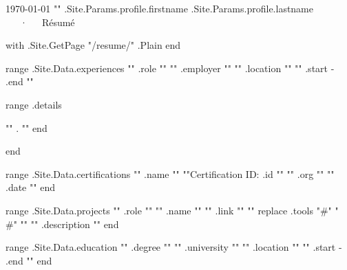 \documentclass[11pt, letterpaper]{awesome-cv}
\begin{document}
\makecvheader[C]

\makecvfooter
  {\today}
  {{"{"}}{{ .Site.Params.profile.firstname }} {{ .Site.Params.profile.lastname }}~~~·~~~Résumé}
  {\thepage}

\begin{cvparagraph}

{{ with .Site.GetPage "/resume/" }}{{ .Plain }}{{ end }}

\end{cvparagraph}

\begin{cventries}

{{ range .Site.Data.experiences }}
  \cventry
    {{"{"}}{{ .role }}{{"}"}}
    {{"{"}}{{ .employer }}{{"}"}}
    {{"{"}}{{ .location }}{{"}"}}
    {{"{"}}{{ .start }} - {{ .end }}{{"}"}}
    {
      \begin{cvitems}{{ range .details }}
        \item{{"{"}}{{ . }}{{"}"}}{{ end }}
      \end{cvitems}
    }

{{ end }}

\end{cventries}

\begin{cvhonors}
{{ range .Site.Data.certifications }}
  \cvhonor
    {{"{"}}{{ .name }}{{"}"}}
    {{"{"}}Certification ID: {{ .id }}{{"}"}}
    {{"{"}}{{ .org }}{{"}"}}
    {{"{"}}{{ .date }}{{"}"}}
{{ end }}

\end{cvhonors}

\begin{cventries}
{{ range .Site.Data.projects }}
  \cventry
    {{"{"}}{{ .role }}{{"}"}}
    {{"{"}}{{ .name }}{{"}"}}
    {{"{"}}{{ .link }}{{"}"}}
    {{"{"}}{{ replace .tools "#" "\\#" }}{{"}"}}
    {{"{"}}{{ .description }}{{"}"}}
{{ end }}

\end{cventries}

\begin{cventries}
{{ range .Site.Data.education }}
  \cventry
    {{"{"}}{{ .degree }}{{"}"}}
    {{"{"}}{{ .university }}{{"}"}}
    {{"{"}}{{ .location }}{{"}"}}
    {{"{"}}{{ .start }} - {{ .end }}{{"}"}}
    {
    }
{{ end }}

\end{cventries}

\end{document}
